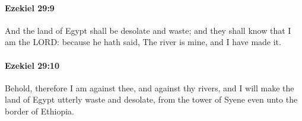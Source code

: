 		\paragraph{Ezekiel 29:9} %
			\label{EZEKIEL-29-9}

			And the land of Egypt shall be desolate and waste; and they shall know that I am the LORD: because he hath said, The river is mine, and I have made it.


		\paragraph{Ezekiel 29:10} %
			\label{EZEKIEL-29-10}

			Behold, therefore I am against thee, and against thy rivers, and I will make the land of Egypt utterly waste and desolate, from the tower of Syene even unto the border of Ethiopia.


